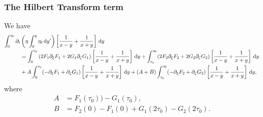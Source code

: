 \documentclass[10pt,reqno,oneside,a4paper, landscape]{article}
\begin{document}
\subsubsection{The Hilbert Transform term}
\begin{prop}\label{HTtransformed}
We have 
\begin{align*}
\int_0^\infty \partial_t &\left( \eta \int^{y}_0\eta_{t} \,\mathrm{d} y' \right) \left[ \frac{1}{x-y} + \frac{1}{x+y} \right] \,\mathrm{d} y \\
&=  \int_0^{\tau_0} \left( 2 F_1  \partial_\xi F_1 + 2 G_1 \partial_\zeta G_1 \right) \left[ \frac{1}{x-y} + \frac{1}{x+y} \right] \,\mathrm{d} y +\int_{\tau_0}^\infty (2 F_2 \partial_\xi F_2 + 2 G_2 \partial_\zeta G_2 )\left[ \frac{1}{x-y} + \frac{1}{x+y} \right] \,\mathrm{d} y \\
&+ A \int_0^{\tau_0} (-\partial_\xi F_1 + \partial_\zeta G_1) \left[ \frac{1}{x-y} + \frac{1}{x+y} \right] \,\mathrm{d} y + (A+B)\int_{\tau_0}^\infty (- \partial_\xi F_2+ \partial_\zeta G_2) \left[ \frac{1}{x-y} + \frac{1}{x+y} \right] \,\mathrm{d} y,
\end{align*}
where 
\begin{align*}
A &= F_1(\tau_0) ) - G_1(\tau_0), \\
B &= F_2(0) - F_1(0)  +  G_1(2\tau_0) - G_2(2\tau_0). 
\end{align*}
\end{prop}
\end{document}
